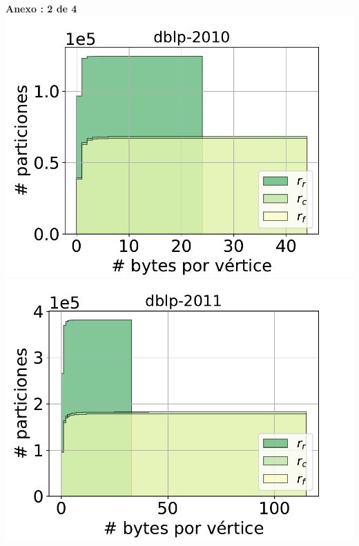 \centering
\begin{minipage}{1\textwidth}
    \centering
	\textbf{Anexo \thechapter:  2 de 4}
    \includegraphics[width=.9\linewidth]{img/cdf/dblp-2010.pdf} \\
    \includegraphics[width=.9\linewidth]{img/cdf/dblp-2011.pdf} \\
\end{minipage}

